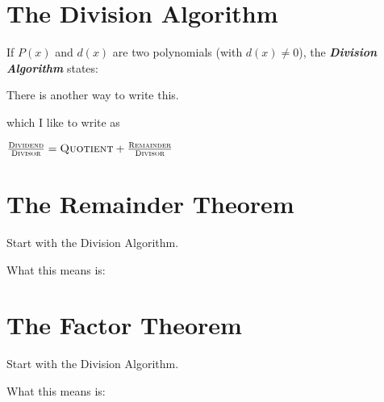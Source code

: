 \section{The Division Algorithm}

If $P(x)$ and $d(x)$ are two polynomials (with $d(x) \ne 0$),
the {\bfseries\itshape Division Algorithm} states:

\myCenteredBox[width=3.5in,valign=center]{
    \Large
    \vspace{-\baselineskip}
    \[ P(x) = Q(x) d(x) + R(x) \]
}

There is another way to write this.

\myCenteredBox[width=3.5in,valign=center]{
    \Large
    \[ \frac{P(x)}{d(x)} = Q(x) + \frac{R(x)}{d(x)} \]
}

which I like to write as 

{
    \Large
    \begin{center}
    $ 
    \frac{\text{\scshape Dividend}}{\text{\scshape Divisor}} 
    =
    \text{\scshape Quotient} 
        + 
        \frac{\text{\scshape Remainder}}{\text{\scshape Divisor}} 
    $
    \end{center}
}



\newpage




\section{The Remainder Theorem}

Start with the Division Algorithm.

\vspace{2.5in}

What this means is:




\section{The Factor Theorem}

Start with the Division Algorithm.

\vspace{2.5in}

What this means is:

